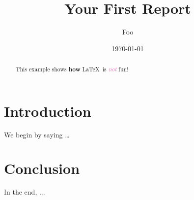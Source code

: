 \documentclass[12pt,oneside,onecolumn,a4paper]{report}
\title{Your First Report}
\author{Foo}
\date{\today} %
\begin{document}
	\maketitle

	\begin{abstract}
		This example shows \textbf{how} \LaTeX\ is \textcolor{HotPink}{\emph{not}} fun!
	\end{abstract}

	\section*{Introduction}
	We begin by saying \ldots

	

	\section*{Conclusion}
	In the end, ...
\end{document}
